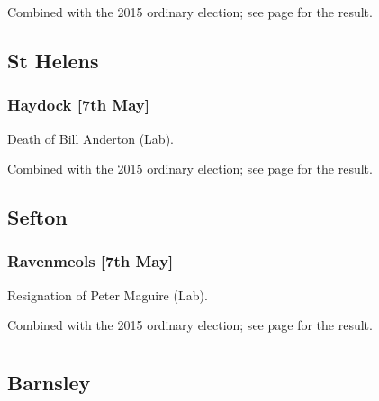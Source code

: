 \documentclass[a4paper,openany]{book}
\begin{document}
\begin{resultsiii}


Combined with the 2015 ordinary election; see page \pageref{FazakerleyLiverpool} for the result.

\subsection*{St Helens}

\subsubsection*{Haydock \hspace*{\fill}\nolinebreak[1]%
\enspace\hspace*{\fill}
[7th May]}


Death of Bill Anderton (Lab).

Combined with the 2015 ordinary election; see page \pageref{HaydockStHelens} for the result.

\subsection*{Sefton}

\subsubsection*{Ravenmeols \hspace*{\fill}\nolinebreak[1]%
\enspace\hspace*{\fill}
[7th May]}


Resignation of Peter Maguire (Lab).

Combined with the 2015 ordinary election; see page \pageref{RavenmeolsSefton} for the result.

\section[South Yorkshire]{}

\subsection*{Barnsley}


\end{resultsiii}
\end{document}
